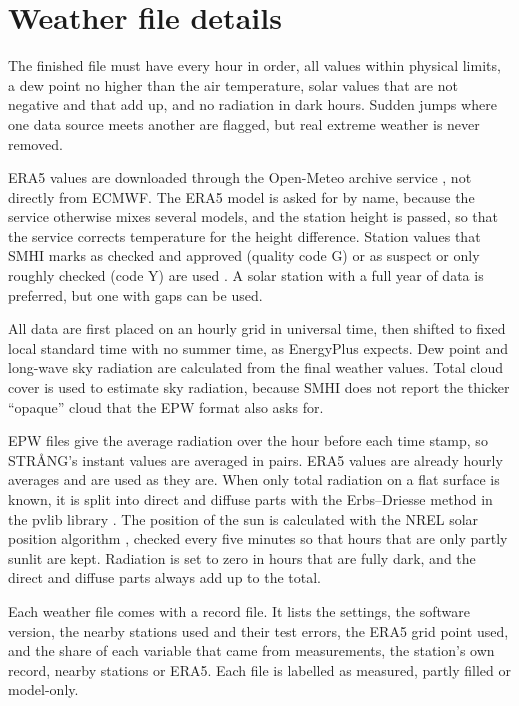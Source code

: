 \section{Weather file details}\label{app:A}
\setcounter{figure}{0}\setcounter{table}{0}
\renewcommand{\thefigure}{A\arabic{figure}}
\renewcommand{\thetable}{A\arabic{table}}

The finished file must have every hour in order, all values within physical limits, a dew point no higher than the air temperature, solar values that are not negative and that add up, and no radiation in dark hours. Sudden jumps where one data source meets another are flagged, but real extreme weather is never removed.

ERA5 values are downloaded through the Open-Meteo archive service \citep{zippenfenig2024}, not directly from ECMWF. The ERA5 model is asked for by name, because the service otherwise mixes several models, and the station height is passed, so that the service corrects temperature for the height difference. Station values that SMHI marks as checked and approved (quality code G) or as suspect or only roughly checked (code Y) are used \citep{smhi2026a}. A solar station with a full year of data is preferred, but one with gaps can be used.

All data are first placed on an hourly grid in universal time, then shifted to fixed local standard time with no summer time, as EnergyPlus expects. Dew point and long-wave sky radiation are calculated from the final weather values. Total cloud cover is used to estimate sky radiation, because SMHI does not report the thicker ``opaque'' cloud that the EPW format also asks for.

EPW files give the average radiation over the hour before each time stamp, so STRÅNG's instant values are averaged in pairs. ERA5 values are already hourly averages and are used as they are. When only total radiation on a flat surface is known, it is split into direct and diffuse parts with the Erbs--Driesse method \citep{erbs1982,driesse2024} in the pvlib library \citep{anderson2023}. The position of the sun is calculated with the NREL solar position algorithm \citep{reda2004}, checked every five minutes so that hours that are only partly sunlit are kept. Radiation is set to zero in hours that are fully dark, and the direct and diffuse parts always add up to the total.

Each weather file comes with a record file. It lists the settings, the software version, the nearby stations used and their test errors, the ERA5 grid point used, and the share of each variable that came from measurements, the station's own record, nearby stations or ERA5. Each file is labelled as measured, partly filled or model-only.

